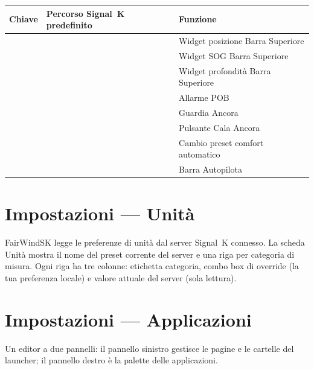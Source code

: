 \begin{longtable}{L{3.0cm}L{5.6cm}L{5.1cm}}
\toprule
{}
\color{white}\sffamily\bfseries Chiave &
\color{white}\sffamily\bfseries Percorso Signal~K predefinito &
\color{white}\sffamily\bfseries Funzione \\
\midrule
{}              &                         & Widget posizione Barra Superiore \\
              &                  & Widget SOG Barra Superiore \\
              &           & Widget profondità Barra Superiore \\
&                           & Allarme POB \\
    &             & Guardia Ancora \\
 &          & Pulsante Cala Ancora \\
  &                             & Cambio preset comfort automatico \\
  &                    & Barra Autopilota \\
\bottomrule
\end{longtable}

\chapter{Impostazioni --- Unità}
\label{ch:impostazioni-unita}

FairWindSK legge le preferenze di unità dal server Signal~K connesso.
La scheda Unità mostra il nome del preset corrente del server e una riga per categoria
di misura. Ogni riga ha tre colonne: etichetta categoria, combo box di override (la tua
preferenza locale) e valore attuale del server (sola lettura).

\chapter{Impostazioni --- Applicazioni}
\label{ch:impostazioni-applicazioni}

Un editor a due pannelli: il pannello sinistro gestisce le pagine e le cartelle del launcher;
il pannello destro è la palette delle applicazioni.

